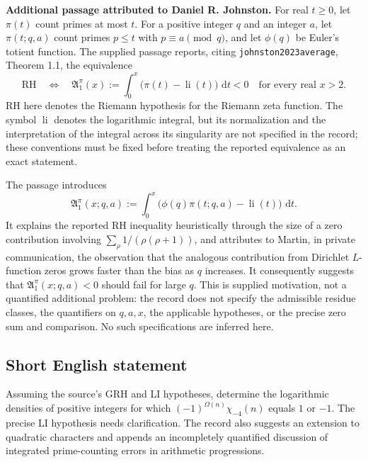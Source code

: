 \documentclass[11pt]{article}
\newcommand{\dd}{\,\mathrm{d}}
\begin{document}
\textbf{Additional passage attributed to Daniel R. Johnston.} For real \(t\ge0\), let \(\pi(t)\) count primes at most \(t\). For a positive integer \(q\) and an integer \(a\), let \(\pi(t;q,a)\) count primes \(p\le t\) with \(p\equiv a\pmod q\), and let \(\phi(q)\) be Euler's totient function. The supplied passage reports, citing \texttt{johnston2023average}, Theorem 1.1, the equivalence
\[
\mathrm{RH}\quad\Longleftrightarrow\quad
\mathfrak A_1^\pi(x):=\int_0^x\bigl(\pi(t)-\operatorname{li}(t)\bigr)\,\dd t<0
\quad\text{for every real }x>2.
\]
RH here denotes the Riemann hypothesis for the Riemann zeta function. The symbol \(\operatorname{li}\) denotes the logarithmic integral, but its normalization and the interpretation of the integral across its singularity are not specified in the record; these conventions must be fixed before treating the reported equivalence as an exact statement.

The passage introduces
\[
\mathfrak A_1^\pi(x;q,a):=\int_0^x\bigl(\phi(q)\pi(t;q,a)-\operatorname{li}(t)\bigr)\,\dd t.
\]
It explains the reported RH inequality heuristically through the size of a zero contribution involving \(\sum_\rho 1/(\rho(\rho+1))\), and attributes to Martin, in private communication, the observation that the analogous contribution from Dirichlet \(L\)-function zeros grows faster than the bias as \(q\) increases. It consequently suggests that \(\mathfrak A_1^\pi(x;q,a)<0\) should fail for large \(q\). This is supplied motivation, not a quantified additional problem: the record does not specify the admissible residue classes, the quantifiers on \(q,a,x\), the applicable hypotheses, or the precise zero sum and comparison. No such specifications are inferred here.
\subsection{Short English statement}
Assuming the source's GRH and LI hypotheses, determine the logarithmic densities of positive integers for which \((-1)^{\Omega(n)}\chi_{-4}(n)\) equals \(1\) or \(-1\). The precise LI hypothesis needs clarification. The record also suggests an extension to quadratic characters and appends an incompletely quantified discussion of integrated prime-counting errors in arithmetic progressions.
\end{document}

